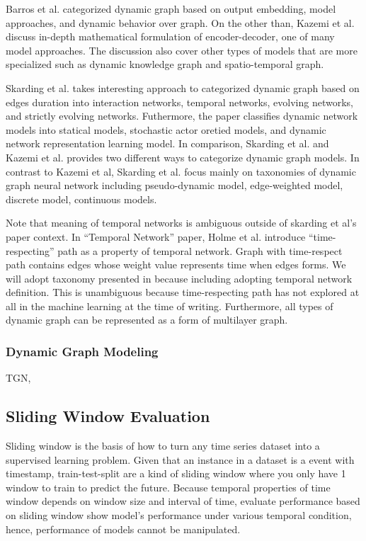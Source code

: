 \documentclass{IEEEtran}
\begin{document}
Barros et al. \cite{barrosSurveyEmbeddingDynamic2021} categorized dynamic graph based on output embedding, model approaches, and dynamic behavior over graph. On the other than, Kazemi et al. \cite{kazemiRepresentationLearningDynamica} discuss in-depth mathematical formulation of encoder-decoder, one of many model approaches. The discussion also cover other types of models that are more specialized such as dynamic knowledge graph and spatio-temporal graph.

Skarding et al. \cite{skardingFoundationsModelingDynamic2021} takes interesting approach to categorized dynamic graph based on edges duration into interaction networks, temporal networks, evolving networks, and strictly evolving networks. Futhermore, the paper classifies dynamic network models into statical models, stochastic actor oretied models, and dynamic network representation learning model. In comparison, Skarding et al. \cite{skardingFoundationsModelingDynamic2021} and Kazemi et al. \cite{kazemiRepresentationLearningDynamica} provides two different ways to categorize dynamic graph models. In contrast to Kazemi et al, Skarding et al. focus mainly on taxonomies of dynamic graph neural network including pseudo-dynamic model, edge-weighted model, discrete model, continuous models.

Note that meaning of temporal networks is ambiguous outside of skarding et al's paper \cite{skardingFoundationsModelingDynamic2021} context. In ``Temporal Network'' paper, Holme et al. \cite{holme2012temporal} introduce ``time-respecting'' path as a property of temporal network. Graph with time-respect path contains edges whose weight value represents time when edges forms. We will adopt taxonomy presented in \cite{skardingFoundationsModelingDynamic2021} because including adopting temporal network definition. This is unambiguous because time-respecting path has not explored at all in the machine learning at the time of writing. Furthermore, all types of dynamic graph can be represented as a form of multilayer graph. \cite{kivela2014multilayer}


\subsubsection{Dynamic Graph Modeling}
\label{sec:orgf6b2258}
TGN,
\subsection{Sliding Window Evaluation}
\label{sec:orgaf0743f}
Sliding window is the basis of how to turn any time series dataset into a supervised learning problem. Given that an instance in a dataset is a event with timestamp, train-test-split are a kind of sliding window where you only have 1 window to train to predict the future. Because temporal properties of time window depends on window size and interval of time, evaluate performance based on sliding window show model's performance under various temporal condition, hence, performance of models cannot be manipulated.
\end{document}
